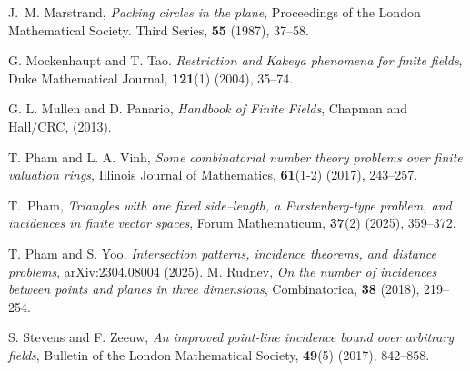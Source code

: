 \documentclass[11pt]{article}
\begin{document}
\begin{thebibliography}{}

 J.~M. Marstrand, {\em {P}acking circles in the plane}, Proceedings of the London Mathematical Society. Third Series, {\bf 55} (1987), 37--58.


  G. Mockenhaupt and T. Tao. {\it Restriction and Kakeya phenomena for finite fields}, Duke Mathematical Journal, {\bf 121}(1) (2004), 35--74.

 G. L. Mullen and D. Panario, \textit{Handbook of Finite Fields}, Chapman and Hall/CRC, (2013).







 T. Pham and L. A. Vinh, \textit{Some combinatorial number theory problems over finite valuation rings}, Illinois Journal of Mathematics, \textbf{61}(1-2) (2017), 243--257.

  T.~Pham, {\it Triangles with one fixed side–length, a Furstenberg-type problem, and incidences in finite vector spaces}, Forum Mathematicum, \textbf{37}(2) (2025), 359--372.

T. Pham and S. Yoo, \textit{Intersection patterns, incidence theorems, and distance problems}, arXiv:2304.08004 (2025).
  M. Rudnev, \textit{On the number of incidences between points and planes in three dimensions}, Combinatorica, \textbf{38} (2018), 219--254.


  S. Stevens and F. Zeeuw, \textit{An improved point-line incidence bound over arbitrary fields}, Bulletin of the London Mathematical Society, \textbf{49}(5) (2017), 842--858.


\end{thebibliography}
\end{document}
